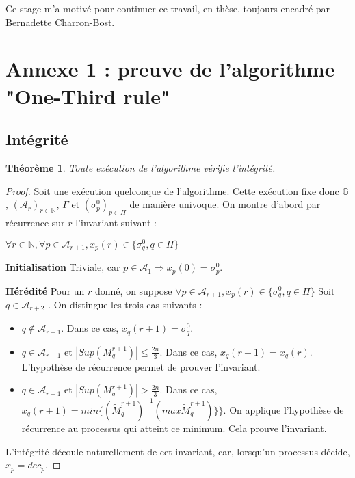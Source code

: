 \documentclass{article}
\newtheorem{theorem}{Théorème}
\begin{document}
Ce stage m'a motivé pour continuer ce travail, en thèse, toujours encadré par Bernadette Charron-Bost.

\printbibliography

\section{Annexe 1 : preuve de l'algorithme "One-Third rule"}


\subsection{Intégrité}

\begin{theorem}
	Toute exécution de l'algorithme vérifie l'intégrité.
\end{theorem}
\begin{proof}
	Soit une exécution quelconque de l'algorithme. Cette exécution fixe donc $\mathds{G}$, $(\mathcal{A}_r)_{r \in \mathds{N}}$, $\Gamma$ et $(\sigma^0_p)_{p \in \Pi}$ de manière univoque.
	On montre d'abord par récurrence sur $r$ l'invariant suivant : 

	$  \forall r \in \mathds{N}, \forall p \in \mathcal{A}_{r+1}, x_p(r) \in \{\sigma^0_q, q \in \Pi\}$

\textbf{Initialisation}
	Triviale, car $p \in \mathcal{A}_1 \Rightarrow x_p(0) = \sigma^0_p$. 

\textbf{Hérédité}
	Pour un $r$ donné, on suppose $\forall p \in \mathcal{A}_{r+1}, x_p(r) \in \{\sigma^0_q, q \in \Pi\}$
	Soit $q \in \mathcal{A}_{r+2}$ . On distingue les trois cas suivants :
\begin{itemize}
	\item $q \notin \mathcal{A}_{r+1}$. Dans ce cas, $x_q(r+1) = \sigma^0_q$.
	\item $q \in \mathcal{A}_{r+1}$ et $|Sup(M_q^{r+1}) | \leq \frac{2 n}{3}$. Dans ce cas, $x_q(r+1) = x_q(r)$. L'hypothèse de récurrence permet de prouver l'invariant.
	\item $q \in \mathcal{A}_{r+1}$ et $|Sup(M_q^{r+1}) | >    \frac{2 n}{3}$. Dans ce cas, $x_q(r+1) = min \{(\widetilde{M}^{r+1}_q)^{-1} (max \widetilde{M}_q^{r+1})\}\}$.
		On applique l'hypothèse de récurrence au processus qui atteint ce minimum. Cela prouve l'invariant.

\end{itemize}

L'intégrité découle naturellement de cet invariant, car, lorsqu'un processus décide, $x_p = dec_p$.
\end{proof}
\end{document}
